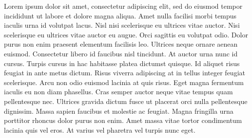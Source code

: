 \pagestyle{empty}

\newenvironment {abstract}%
{\cleardoublepage \null \vfill \begin{center}%
\bfseries 	\abstractname \end{center}}%
{\vfill \null }

\begin{abstract}

Lorem ipsum dolor sit amet, consectetur adipiscing elit, sed do eiusmod tempor incididunt ut labore et dolore magna aliqua. Amet nulla facilisi morbi tempus iaculis urna id volutpat lacus. Nisl nisi scelerisque eu ultrices vitae auctor. Nisi scelerisque eu ultrices vitae auctor eu augue. Orci sagittis eu volutpat odio. Dolor purus non enim praesent elementum facilisis leo. Ultrices neque ornare aenean euismod. Consectetur libero id faucibus nisl tincidunt. At auctor urna nunc id cursus. Turpis cursus in hac habitasse platea dictumst quisque. Id aliquet risus feugiat in ante metus dictum. Risus viverra adipiscing at in tellus integer feugiat scelerisque. Arcu non odio euismod lacinia at quis risus. Eget magna fermentum iaculis eu non diam phasellus. Cras semper auctor neque vitae tempus quam pellentesque nec. Ultrices gravida dictum fusce ut placerat orci nulla pellentesque dignissim. Massa sapien faucibus et molestie ac feugiat. Magna fringilla urna porttitor rhoncus dolor purus non enim. Amet massa vitae tortor condimentum lacinia quis vel eros. At varius vel pharetra vel turpis nunc eget.

\end{abstract}